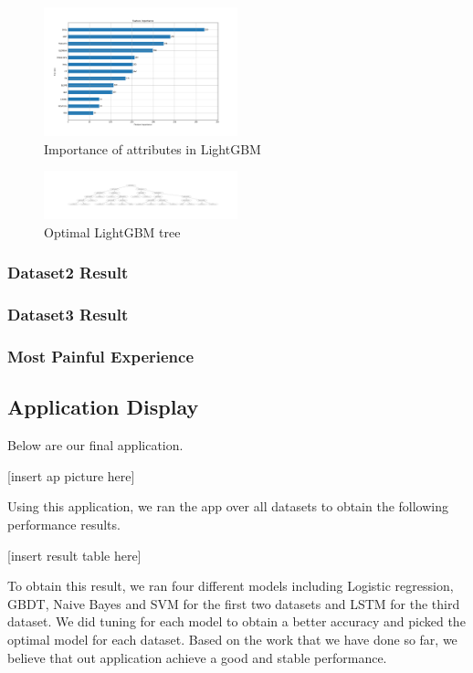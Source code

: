 \documentclass[letterpaper]{article} %
\begin{document}
\begin{figure}[!htbp]
\centering\includegraphics[width=0.5\textwidth]{dataset-1-impor}
\caption{Importance of attributes in LightGBM}
\label{fig:dataset-1-impor}
\end{figure}

\begin{figure}[!htbp]
\centering\includegraphics[width=0.5\textwidth]{dataset-1-res}
\caption{Optimal LightGBM tree}
\label{fig:dataset-1-res}
\end{figure}
\subsubsection{Dataset2 Result}

\subsubsection{Dataset3 Result}

\subsubsection{Most Painful Experience}

\subsection{Application Display}

Below are our final application.

[insert ap picture here]

Using this application, we ran the app over all datasets to obtain the following performance results.

[insert result table here]

To obtain this result, we ran four different models including Logistic regression, GBDT, Naive Bayes and SVM for the first two datasets and LSTM for the third dataset. We did tuning for each model to obtain a better accuracy and picked the optimal model for each dataset. Based on the work that we have done so far, we believe that out application achieve a good and stable performance.
\end{document}
